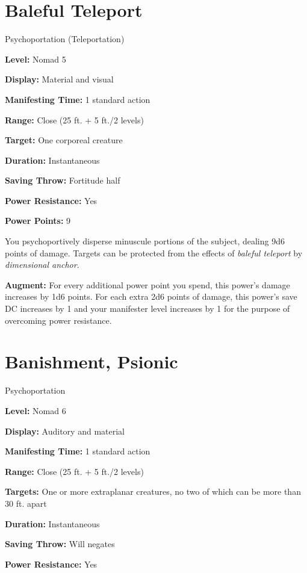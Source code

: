 \documentclass{article}
\begin{document}
\vspace{12pt}
\section*{Baleful Teleport}

Psychoportation (Teleportation)

\textbf{Level:} Nomad 5

\textbf{Display:} Material and visual

\textbf{Manifesting Time:} 1 standard action

\textbf{Range:} Close (25 ft. + 5 ft./2 levels)

\textbf{Target:} One corporeal creature

\textbf{Duration:} Instantaneous

\textbf{Saving Throw:} Fortitude half

\textbf{Power Resistance:} Yes

\textbf{Power Points:} 9

You psychoportively disperse minuscule portions of the subject, dealing 9d6 points 
of damage. Targets can be protected from the effects of \textit{baleful teleport 
}by \textit{dimensional anchor}.

\textbf{Augment:} For every additional power point you spend, this power's damage 
increases by 1d6 points. For each extra 2d6 points of damage, this power's save 
DC increases by 1 and your manifester level increases by 1 for the purpose of overcoming 
power resistance.

\vspace{12pt}
\section*{Banishment, Psionic}

Psychoportation

\textbf{Level:} Nomad 6

\textbf{Display:} Auditory and material

\textbf{Manifesting Time:} 1 standard action

\textbf{Range:} Close (25 ft. + 5 ft./2 levels)

\textbf{Targets:} One or more extraplanar creatures, no two of which can be more 
than 30 ft. apart

\textbf{Duration:} Instantaneous

\textbf{Saving Throw:} Will negates

\textbf{Power Resistance:} Yes
\end{document}
